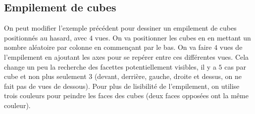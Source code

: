 \subsection{Empilement de cubes}

On peut modifier l'exemple précédent pour dessiner un empilement de cubes positionnés au hasard, avec $4$ vues. On va positionner les cubes en en mettant un nombre aléatoire par colonne en commençant par le bas. On va faire $4$ vues de l'empilement en ajoutant les axes pour se repérer entre ces différentes vues. Cela change un peu la recherche des facettes potentiellement visibles, il y a $5$ cas par cube et non plus seulement $3$ (devant, derrière, gauche, droite et dessus, on ne fait pas de vues de dessous). Pour plus de lisibilité de l'empilement, on utilise trois couleurs pour peindre les faces des cubes (deux faces opposées ont la même couleur).

